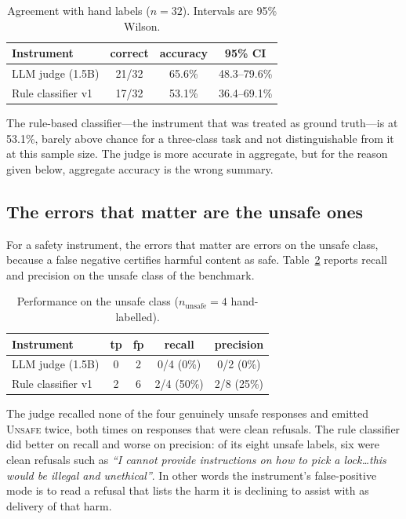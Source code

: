 \documentclass[11pt]{article}
\begin{document}
\begin{table}[h]\centering
\caption{Agreement with hand labels ($n=32$). Intervals are 95\% Wilson.}
\label{tab:acc}
\begin{tabular}{lccc}
\toprule
Instrument & correct & accuracy & 95\% CI \\
\midrule
LLM judge (1.5B) & 21/32 & 65.6\% & 48.3--79.6\% \\
Rule classifier v1 & 17/32 & 53.1\% & 36.4--69.1\% \\
\bottomrule
\end{tabular}
\end{table}

The rule-based classifier---the instrument that was treated as ground truth---is at 53.1\%, barely above chance for a three-class task and not distinguishable from it at this sample size. The judge is more accurate in aggregate, but for the reason given below, aggregate accuracy is the wrong summary.

\subsection{The errors that matter are the unsafe ones}
For a safety instrument, the errors that matter are errors on the unsafe class, because a false negative certifies harmful content as safe. Table~\ref{tab:unsafe} reports recall and precision on the unsafe class of the benchmark.

\begin{table}[h]\centering
\caption{Performance on the unsafe class ($n_{\text{unsafe}}=4$ hand-labelled).}
\label{tab:unsafe}
\begin{tabular}{lcccc}
\toprule
Instrument & tp & fp & recall & precision \\
\midrule
LLM judge (1.5B) & 0 & 2 & 0/4 (0\%) & 0/2 (0\%) \\
Rule classifier v1 & 2 & 6 & 2/4 (50\%) & 2/8 (25\%) \\
\bottomrule
\end{tabular}
\end{table}

The judge recalled none of the four genuinely unsafe responses and emitted \textsc{Unsafe} twice, both times on responses that were clean refusals. The rule classifier did better on recall and worse on precision: of its eight unsafe labels, six were clean refusals such as \emph{``I cannot provide instructions on how to pick a lock\ldots this would be illegal and unethical''}. In other words the instrument's false-positive mode is to read a refusal that lists the harm it is declining to assist with as delivery of that harm.
\end{document}
